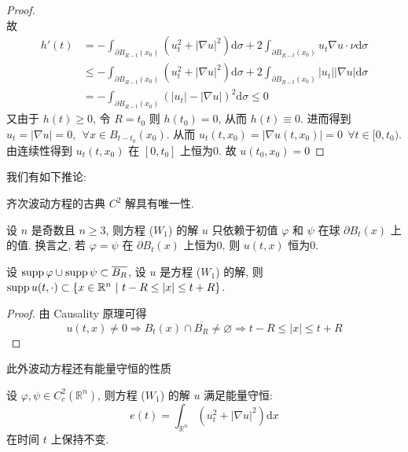\documentclass[11pt]{ctexart}[UTF8]
\begin{document}
\begin{proof}
\begin{equation*}
    \end{equation*}
    故 
    \begin{equation*}
        \begin{aligned}
            h'(t) &= -\int_{\partial B_{R-t}(x_{0})} \left( u_{t}^{2} + |\nabla u|^2 \right)\mathrm{d}\sigma + 2\int_{\partial B_{R-t}(x_{0})} u_{t} \nabla u \cdot \nu \mathrm{d}\sigma\\
                  &\leq -\int_{\partial B_{R-t}(x_{0})} \left( u_{t}^{2} + |\nabla u|^2 \right)\mathrm{d}\sigma + 2\int_{\partial B_{R-t}(x_{0})} |u_{t}| |\nabla u| \mathrm{d}\sigma\\
                  & = -\int_{\partial B_{R-t}(x_{0})} \left( |u_{t}| - |\nabla u| \right)^{2} \mathrm{d}\sigma \leq 0
        \end{aligned}
    \end{equation*}
    又由于 $h(t) \geq 0$, 令 $R = t_0 $ 则 $h(t_0) = 0$, 从而 $h(t) \equiv 0$. 进而得到 $u_{t} = |\nabla u| = 0,\ \ \forall x \in B_{t-t_0}(x_0).$
    从而 $u_{t}(t,x_{0}) = |\nabla u(t,x_{0})| = 0\ \ \forall t \in [0,t_{0})$. 由连续性得到 $u_{t}(t,x_{0})$ 在 $[0,t_0]$ 上恒为0. 故 $u(t_{0},x_{0}) = 0$
\end{proof}
我们有如下推论:
\begin{corollary}
    齐次波动方程的古典 $C^2$ 解具有唯一性.
\end{corollary}
\begin{corollary}[Huygens 原理]
    设 $n$ 是奇数且 $n \geq 3$, 则方程 ($W_{1}$) 的解 $u$ 只依赖于初值 $\varphi$ 和 $\psi$ 在球 $\partial B_{t}(x)$ 上的值. 换言之, 若 $\varphi=\psi$ 在 $\partial B_{t}(x)$ 上恒为0, 则 $u(t,x)$ 恒为0.
\end{corollary}
\begin{corollary}
    设 $\operatorname{supp} \varphi \cup \operatorname{supp} \psi \subset \overline{B_{R}}$, 设 $u$ 是方程 ($W_{1}$) 的解, 则 $\operatorname{supp} u(t,\cdot) \subset \{ x\in \mathbb{R}^{n}\ |\ t-R \leq |x| \leq t+R \}$.
\end{corollary}
\begin{proof}
    由 Causality 原理可得 
    \begin{equation*}
        u(t,x) \neq 0 \Longrightarrow B_t(x) \cap \overline{B_{R}} \neq \varnothing \Longrightarrow t-R \leq |x| \leq t+R
    \end{equation*}
\end{proof}
此外波动方程还有能量守恒的性质
\begin{theorem}
    设 $\varphi, \psi \in C_{c}^{2}(\mathbb{R}^{n})$, 则方程 ($W_{1}$) 的解 $u$ 满足能量守恒:
    \begin{equation*}
        e(t) = \int_{\mathbb{R}^{n}} \left( u_{t}^2 + |\nabla u|^2 \right) \mathrm{d}x
    \end{equation*}
    在时间 $t$ 上保持不变.
\end{theorem}
\end{document}
